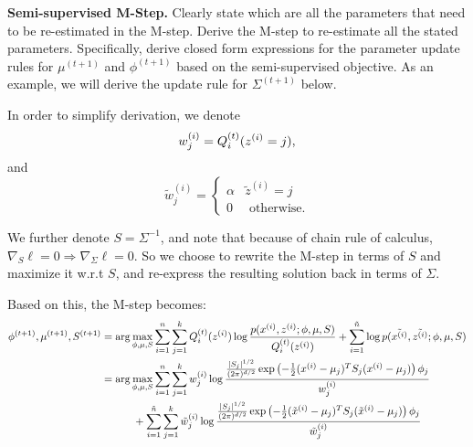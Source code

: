 \item{} \textbf{Semi-supervised M-Step.}
Clearly state which are all the parameters that need to be re-estimated in the M-step. Derive the M-step to re-estimate all the stated parameters.  Specifically,
derive closed form expressions for the parameter update rules for $\mu^{(t+1)}$ and $\phi^{(t+1)}$ based on the semi-supervised objective. As an example, we will derive the update rule for $\Sigma^{(t+1)}$ below.

In order to simplify derivation, we denote $$w_j^{(i)} = Q^{(t)}_i(z^{(i)}=j),$$ and $$\tilde{w}_j^{(i)} = \begin{cases} \alpha & \tilde{z}^{(i)} = j \\ 0 & \text{ otherwise.} \end{cases}$$

We further denote $S = \Sigma^{-1}$, and note that because of chain rule of calculus, $\nabla_S\ell = 0 \Rightarrow \nabla_\Sigma \ell = 0$. So we choose to rewrite the M-step in terms of $S$ and maximize it w.r.t $S$, and re-express the resulting solution back in terms of $\Sigma$.

Based on this, the M-step becomes:
\begin{align*}
\phi^{(t+1)}, \mu^{(t+1)}, S^{(t+1)} &=  \arg\max_{\phi,\mu,S} \sum_{i=1}^{n} \sum_{j=1}^k Q_i^{(t)}(z^{(i)}) \log \frac{p(x^{(i)},z^{(i)};\phi,\mu,S)}{Q_i^{(t)}(z^{(i)})} + \sum_{i=1}^{\tilde{{n}}} \log p(\tilde{x^{(i)}}, \tilde{z^{(i)}}; \phi, \mu, S)\\
&=\arg\max_{\phi, \mu, S} \sum_{i=1}^{n} \sum_{j=1}^k w^{(i)}_j \log \frac{ \frac{|S_j|^{1/2}}{(2\pi)^{{d}/2}} \exp\left(-\frac{1}{2}(x^{(i)}-\mu_j)^TS_j(x^{(i)}-\mu_j)\right) \phi_j}{w^{(i)}_j } \\
&\quad\quad\quad +\sum_{i=1}^{\tilde{{n}}} \sum_{j=1}^k \tilde{w}^{(i)}_j \log \frac{ \frac{|S_j|^{1/2}}{(2\pi)^{{d}/2}} \exp\left(-\frac{1}{2}(\tilde{x}^{(i)}-\mu_j)^TS_j(\tilde{x}^{(i)}-\mu_j)\right) \phi_j}{\tilde{w}^{(i)}_j } \\
\end{align*}


